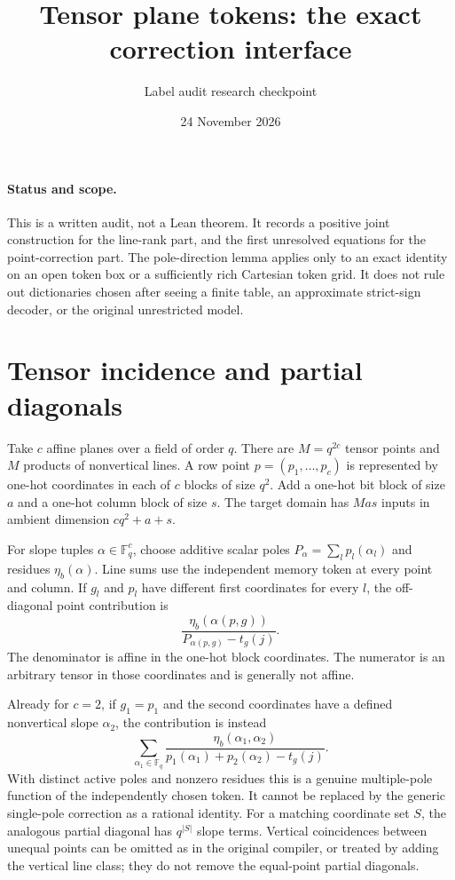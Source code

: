 \documentclass[11pt]{article}
\title{Tensor plane tokens: the exact correction interface}
\date{24 November 2026}
\author{Label audit research checkpoint}
\begin{document}
\maketitle

\paragraph{Status and scope.}
This is a written audit, not a Lean theorem. It records a positive joint
construction for the line-rank part, and the first unresolved equations for
the point-correction part. The pole-direction lemma applies only to an exact
identity on an open token box or a sufficiently rich Cartesian token grid.
It does not rule out dictionaries chosen after seeing a finite table, an
approximate strict-sign decoder, or the original unrestricted model.

\section{Tensor incidence and partial diagonals}

Take $c$ affine planes over a field of order $q$. There are
$M=q^{2c}$ tensor points and $M$ products of nonvertical lines. A row point
$p=(p_1,\ldots,p_c)$ is represented by one-hot coordinates in each of $c$
blocks of size $q^2$. Add a one-hot bit block of size $a$ and a one-hot
column block of size $s$. The target domain has $Mas$ inputs in ambient
dimension $cq^2+a+s$.

For slope tuples $\alpha\in\mathbb F_q^c$, choose additive scalar poles
$P_\alpha=\sum_l p_l(\alpha_l)$ and residues $\eta_b(\alpha)$.
Line sums use the independent memory token at every point and column.
If $g_l$ and $p_l$ have different first coordinates for every $l$, the
off-diagonal point contribution is
\[
 \frac{\eta_b(\alpha(p,g))}{P_{\alpha(p,g)}-t_g(j)}.
\]
The denominator is affine in the one-hot block coordinates. The numerator
is an arbitrary tensor in those coordinates and is generally not affine.

Already for $c=2$, if $g_1=p_1$ and the second coordinates have a defined
nonvertical slope $\alpha_2$, the contribution is instead
\[
 \sum_{\alpha_1\in\mathbb F_q}
 \frac{\eta_b(\alpha_1,\alpha_2)}
 {p_1(\alpha_1)+p_2(\alpha_2)-t_g(j)}.
\]
With distinct active poles and nonzero residues this is a genuine
multiple-pole function of the independently chosen token. It cannot be
replaced by the generic single-pole correction as a rational identity.
For a matching coordinate set $S$, the analogous partial diagonal has
$q^{|S|}$ slope terms. Vertical coincidences between unequal points can
be omitted as in the original compiler, or treated by adding the vertical
line class; they do not remove the equal-point partial diagonals.
\end{document}
